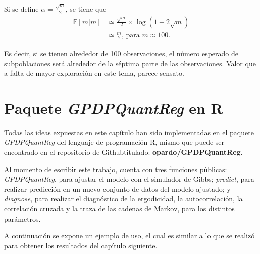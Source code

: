 Si se define $\alpha = \frac{\sqrt{m}}{2}$, se tiene que
\begin{equation*}
\begin{aligned}
    \mathbb{E}[\bar{m}|m] 
    &\simeq 
    \frac{\sqrt{m}}{2}
    \times
    \log 
    \left(
        1 + 2\sqrt{m}
    \right)\\
    &\simeq
    \frac{m}{7} 
    \text{, para } m \approx 100.
\end{aligned}
\end{equation*}

Es decir, si se tienen alrededor de 100 observaciones, el n\'umero esperado de subpoblaciones ser\'a alrededor de la s\'eptima parte de las observaciones. Valor que a falta de mayor exploraci\'on en este tema, parece sensato.

\section{Paquete \textit{GPDPQuantReg} en R}

Todas las ideas expuestas en este cap\'itulo han sido implementadas en el paquete \textit{GPDPQuantReg} del lenguaje de programaci\'on R, mismo que puede ser encontrado en el repositorio de Github\faGithub \space titulado: \textbf{opardo/GPDPQuantReg}.

Al momento de escribir este trabajo, cuenta con tres funciones p\'ublicas: \textit{GPDPQuantReg}, para ajustar el modelo con el simulador de Gibbs; \textit{predict}, para realizar predicci\'on en un nuevo conjunto de datos del modelo ajustado; y \textit{diagnose}, para realizar el diagn\'ostico de la ergodicidad, la autocorrelaci\'on, la correlaci\'on cruzada y la traza de las cadenas de Markov, para los distintos par\'ametros.

A continuaci\'on se expone un ejemplo de uso, el cual es similar a lo que se realiz\'o para obtener los resultados del cap\'itulo siguiente.



\newpage